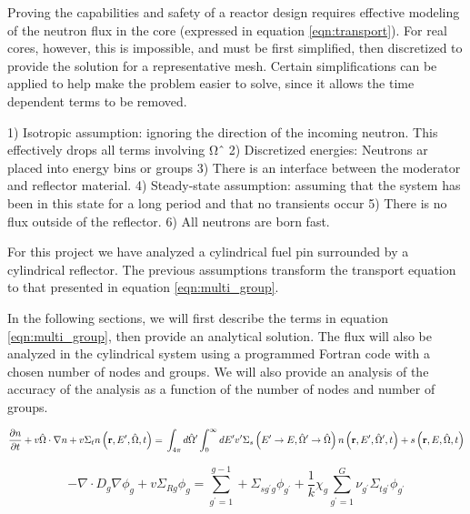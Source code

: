 \documentclass[../main.tex]{subfiles}
\begin{document}
Proving the capabilities and safety of a reactor design requires effective modeling of the neutron flux in the core (expressed in equation \ref{eqn:transport}). For real cores, however, this is impossible, and must be first simplified, then discretized to provide the solution for a representative mesh. Certain simplifications can be applied to help make the problem easier to solve, since it allows the time dependent terms to be removed.

1) Isotropic assumption: ignoring the direction of the incoming neutron. This effectively drops all terms involving Ωˆ
2) Discretized energies:  Neutrons ar placed into energy bins or groups
3) There is an interface between the moderator and reflector material.
4) Steady-state assumption: assuming that the system has been in this state for a long period and that no transients occur
5) There is no flux outside of the reflector.
6) All neutrons are born fast.



	For this project we have analyzed a cylindrical fuel pin surrounded by a cylindrical reflector.  The previous assumptions transform the transport equation to that presented in equation \ref{eqn:multi_group}.

	In the following sections, we will first describe the terms in equation \ref{eqn:multi_group}, then provide an analytical solution. The flux will also be analyzed in the cylindrical system using a programmed Fortran code with a chosen number of nodes and groups. We will also provide an analysis of the accuracy of the analysis as a function of the number of nodes and number of groups. 

	
	\begin{equation}
		\pdv{n}{t} + v \hat{\Omega} \cdot \nabla n + v \Sigma_t n \left( \mathbf{r}, E^\prime, \hat{\Omega}, t \right) = \\ \int_{4\pi} d \hat{\Omega} ^\prime \int_0^{\infty} dE ^\prime v^\prime \Sigma_s\left( E ^\prime \rightarrow E, \hat{\Omega} ^\prime \rightarrow \hat{\Omega} \right) n\left( \mathbf{r}, E ^\prime, \hat{\Omega} ^\prime, t \right) + s\left( \mathbf{r}, E, \hat{\Omega}, t \right)
		\label{eqn:transport}
	\end{equation}
	
	\begin{equation}
		- \nabla \cdot D_{g} \nabla \phi_{g}+ v \Sigma_{Rg} \phi_g = \sum_{g^'=1}^{g-1} + \Sigma_{sg^'g} \phi_{g^'} + \frac{1}{k} \chi_g \sum_{g^'=1}^{G} \nu_{g^'} \Sigma_{tg^'} \phi_{g^'} 
		\label{eqn:multi_group}
	\end{equation}
  
\end{document}
